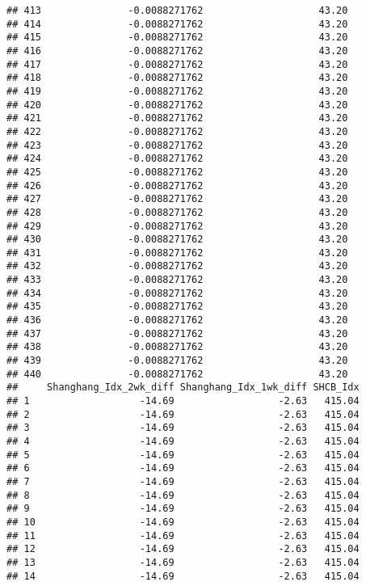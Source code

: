 \documentclass[]{article}
\begin{document}
\begin{verbatim}
## 413               -0.0088271762                    43.20
## 414               -0.0088271762                    43.20
## 415               -0.0088271762                    43.20
## 416               -0.0088271762                    43.20
## 417               -0.0088271762                    43.20
## 418               -0.0088271762                    43.20
## 419               -0.0088271762                    43.20
## 420               -0.0088271762                    43.20
## 421               -0.0088271762                    43.20
## 422               -0.0088271762                    43.20
## 423               -0.0088271762                    43.20
## 424               -0.0088271762                    43.20
## 425               -0.0088271762                    43.20
## 426               -0.0088271762                    43.20
## 427               -0.0088271762                    43.20
## 428               -0.0088271762                    43.20
## 429               -0.0088271762                    43.20
## 430               -0.0088271762                    43.20
## 431               -0.0088271762                    43.20
## 432               -0.0088271762                    43.20
## 433               -0.0088271762                    43.20
## 434               -0.0088271762                    43.20
## 435               -0.0088271762                    43.20
## 436               -0.0088271762                    43.20
## 437               -0.0088271762                    43.20
## 438               -0.0088271762                    43.20
## 439               -0.0088271762                    43.20
## 440               -0.0088271762                    43.20
##     Shanghang_Idx_2wk_diff Shanghang_Idx_1wk_diff SHCB_Idx
## 1                   -14.69                  -2.63   415.04
## 2                   -14.69                  -2.63   415.04
## 3                   -14.69                  -2.63   415.04
## 4                   -14.69                  -2.63   415.04
## 5                   -14.69                  -2.63   415.04
## 6                   -14.69                  -2.63   415.04
## 7                   -14.69                  -2.63   415.04
## 8                   -14.69                  -2.63   415.04
## 9                   -14.69                  -2.63   415.04
## 10                  -14.69                  -2.63   415.04
## 11                  -14.69                  -2.63   415.04
## 12                  -14.69                  -2.63   415.04
## 13                  -14.69                  -2.63   415.04
## 14                  -14.69                  -2.63   415.04

\end{verbatim}
\end{document}
